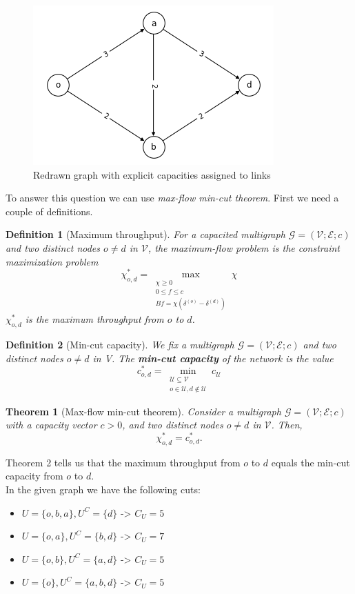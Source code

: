 \documentclass[
	12pt, %
]{fphw}
\newtheorem{theorem}{Theorem}
\newtheorem{definition}{Definition}
\begin{document}
\begin{enumerate}[{\bfseries (a)}]
        \begin{figure}[H]
        \centering
        	\includegraphics[width=0.5\columnwidth]{graph1-b.png} %
        	\caption{Redrawn graph with explicit capacities assigned to links}
        	\label{fig:figEx1b}
        \end{figure}
        To answer this question we can use \emph{max-flow min-cut theorem}.
        First we need a couple of definitions.
        \begin{definition}[Maximum throughput]
            For a capacited multigraph $\mathcal{G} = (\mathcal{V}; \mathcal{E}; c)$ and two distinct nodes $o \neq d$ in $\mathcal{V}$, the maximum-flow problem is the constraint maximization problem
            $$
                \chi^*_{o,d} = \max_{\substack{\chi \geq 0\\ 0 \leq f \leq c\\ Bf = \chi(\delta^{(o)} - \delta^{(d)})}}\chi
            $$
            $\chi^*_{o,d}$ is the \emph{maximum throughput} from $o$ to $d$.
        \end{definition}
        \begin{definition}[Min-cut capacity]
            We fix a multigraph $\mathcal{G} = (\mathcal{V}; \mathcal{E}; c)$ and two distinct nodes $o \neq d$ in V. 
            The \textbf{min-cut capacity} of the network is the value
            $$
              c^*_{o,d} = \min_{\substack{\mathcal{U} \subseteq \mathcal{V}\\ o \in \mathcal{U}, d \notin \mathcal{U}}} c_{\mathcal{U}} 
            $$
        \end{definition}
        \begin{theorem}[Max-flow min-cut theorem]
            Consider a multigraph $\mathcal{G} = (\mathcal{V}; \mathcal{E}; c)$ with a capacity vector $c > 0$, and two distinct nodes $o \neq d$ in $\mathcal{V}$. Then, 
            $$
                \chi^*_{o,d} = c^*_{o,d}.
            $$
        \end{theorem}
        Theorem 2 tells us that the maximum throughput from $o$ to $d$ equals the min-cut capacity from $o$ to $d$.\\
        In the given graph we have the following cuts: 
        \begin{itemize}
            \item $U=\{o,b,a\},U^C=\{d\}$ -> $C_U = 5$
            \item $U=\{o,a\},U^C=\{b,d\}$ -> $C_U = 7$
            \item $U=\{o,b\},U^C=\{a,d\}$ -> $C_U = 5$
            \item $U=\{o\},U^C=\{a,b,d\}$ -> $C_U = 5$
        \end{itemize}
        

\end{enumerate}
\end{document}
